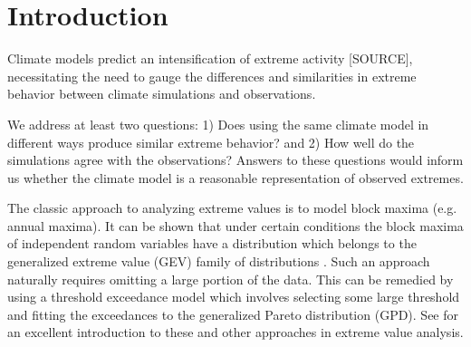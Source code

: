 \section{Introduction}
\label{intro}


Climate models predict an intensification of extreme activity [SOURCE], necessitating the need to gauge the differences and similarities in extreme behavior between climate simulations and observations.


We address at least two questions: 1) Does using the same climate model in different ways produce similar extreme behavior? and 2) How well do the simulations agree with the observations? Answers to these questions would inform us whether the climate model is a reasonable representation of observed extremes.

The classic approach to analyzing extreme values is to model block maxima (e.g. annual maxima). It can be shown that under certain conditions the block maxima of independent random variables have a distribution which belongs to the generalized extreme value (GEV) family of distributions \citep{coles2001introduction}. Such an approach naturally requires omitting a large portion of the data. This can be remedied by using a threshold exceedance model which involves selecting some large threshold and fitting the exceedances to the generalized Pareto distribution (GPD). See \cite{coles2001introduction} for an excellent introduction to these and other approaches in extreme value analysis.







